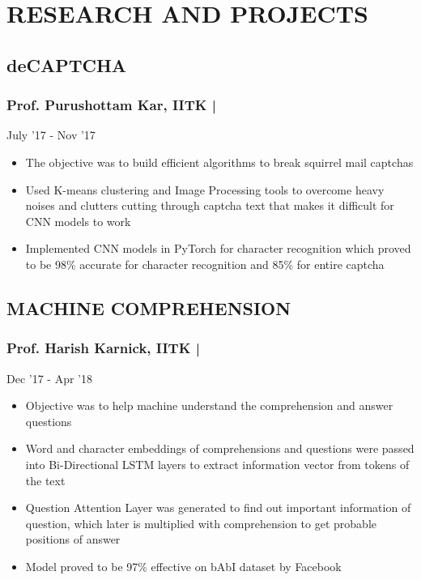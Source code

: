 \documentclass[letterpaper]{twentysecondcv} %
\begin{document}
\section{RESEARCH AND PROJECTS}
\subsection{deCAPTCHA}\subsubsection{Prof. Purushottam Kar, IITK | } \hfill{} July '17 - Nov '17

\begin{itemize}
\item The objective was to build efficient algorithms to break squirrel mail captchas
\item Used K-means clustering and Image Processing tools to overcome heavy noises and clutters cutting through captcha text that makes it difficult for CNN models to work
\item Implemented CNN models in PyTorch for character recognition which proved to be 98\% accurate for character recognition and 85\% for entire captcha
\end{itemize}

\subsection{MACHINE COMPREHENSION}
\subsubsection{Prof. Harish Karnick, IITK | } \hfill{} Dec '17 - Apr '18

\begin{itemize}
\item Objective was to help machine understand the comprehension and answer questions
\item Word and character embeddings of comprehensions and questions were passed into Bi-Directional LSTM layers to extract information vector from tokens of the text
\item Question Attention Layer was generated to find out important information of question, which later is multiplied with comprehension to get probable positions of answer
\item Model proved to be 97\% effective on bAbI dataset by Facebook
\end{itemize}
\end{document}
